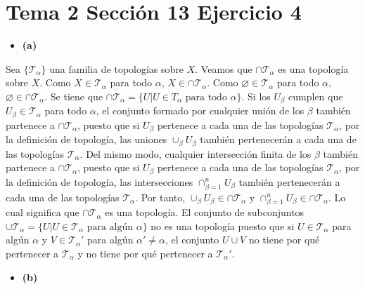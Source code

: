 \documentclass{article}
\begin{document}
\section{Tema 2 Sección 13 Ejercicio 4}
\begin{itemize}
\item \bf (a) \rm
\end{itemize}
Sea $\{\mathcal{T}_{\alpha}\}$ una familia de topologías sobre $X$. Veamos que $\cap \mathcal{T}_{\alpha}$ es una topología sobre $X$. Como $X\in \mathcal{T}_{\alpha}$ para todo $\alpha$, $X\in \cap\mathcal{T}_{\alpha}$. Como $\varnothing\in \mathcal{T}_{\alpha}$ para todo $\alpha$, $\varnothing\in \cap\mathcal{T}_{\alpha}$. Se tiene que $\cap\mathcal{T}_{\alpha}=\{U| U\in {T}_{\alpha} \text{ para todo }\alpha\}$. Si los $U_\beta$ cumplen que $U_\beta \in \mathcal{T}_\alpha$ para todo $\alpha$, el conjunto formado por cualquier unión de los $\beta$ también partenece a $\cap\mathcal{T}_{\alpha}$, puesto que si $U_\beta$ pertenece a cada una de las topologías $\mathcal{T}_{\alpha}$, por la definición de topología, las uniones $\cup_\beta U_\beta$ también pertenecerán a cada una de las topologías $\mathcal{T}_{\alpha}$. Del mismo modo, cualquier intersección finita de los $\beta$ también partenece a $\cap\mathcal{T}_{\alpha}$, puesto que si $U_\beta$ pertenece a cada una de las topologías $\mathcal{T}_{\alpha}$, por la definición de topología, las intersecciones $\cap_{\beta=1}^n U_\beta$ también pertenecerán a cada una de las topologías $\mathcal{T}_{\alpha}$. Por tanto, $\cup_\beta U_\beta\in \cap \mathcal{T}_{\alpha}$ y $\cap_{\beta=1}^n U_\beta\in \cap \mathcal{T}_{\alpha}$. Lo cual significa que $\cap \mathcal{T}_{\alpha}$ es una topología. El conjunto de subconjuntos $\cup \mathcal{T}_\alpha=\{U| U\in \mathcal{T}_\alpha\text{ para algún }\alpha\}$ no es una topología puesto que si $U\in \mathcal{T}_\alpha$ para algún $\alpha$ y $V\in \mathcal{T}_\alpha'$ para algún $\alpha'\neq\alpha$, el conjunto $U\cup V$ no tiene por qué pertenecer a $\mathcal{T}_\alpha$ y no tiene por qué pertenecer a $\mathcal{T}_\alpha'$.
\begin{itemize}
\item \bf (b) \rm
\end{itemize}
\end{document}
